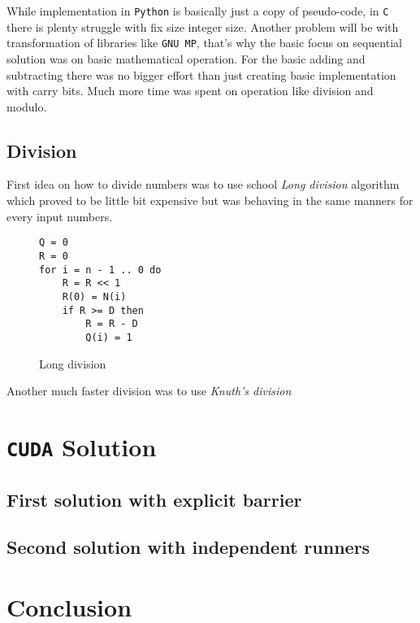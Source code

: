 \documentclass[a4paper]{article}
\begin{document}
While implementation in \texttt{Python} is basically just a copy of pseudo-code, in \texttt{C} there is plenty struggle with fix size integer size. Another problem will be with transformation of libraries like \texttt{GNU MP}, that's why the basic focus on sequential solution was on basic mathematical operation. For the basic adding and subtracting there was no bigger effort than just creating basic implementation with carry bits. Much more time was spent on operation like division and modulo.

\subsection{Division}

First idea on how to divide numbers was to use school \emph{Long division} algorithm which proved to be little bit expensive but was behaving in the same manners for every input numbers.

\begin{figure}[H]
	\centering
	\begin{lstlisting}
Q = 0
R = 0                     
for i = n - 1 .. 0 do
    R = R << 1
    R(0) = N(i)
    if R >= D then
        R = R - D
        Q(i) = 1
	\end{lstlisting}
	\caption{Long division \cite{long_div}}
	\label{long_div}
\end{figure}

Another much faster division was to use \emph{Knuth's division}


\section{\texttt{CUDA} Solution}


\subsection{First solution with explicit barrier}


\subsection{Second solution with independent runners}


\section{Conclusion}





\appendix
\end{document}
